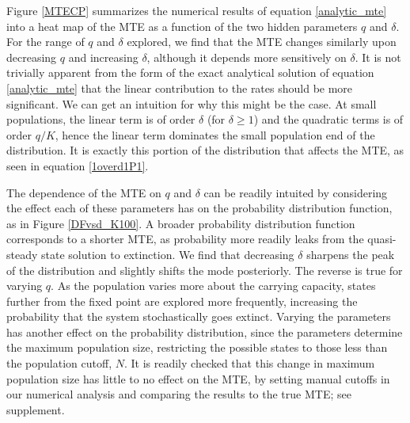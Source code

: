 Figure \ref{MTECP} summarizes the numerical results of equation \ref{analytic_mte} into a heat map of the MTE as a function of the two hidden parameters $q$ and $\delta$.
For the range of $q$ and $\delta$ explored, we find that the MTE changes similarly upon decreasing $q$ and increasing $\delta$, although it depends more sensitively on $\delta$.
It is not trivially apparent from the form of the exact analytical solution of equation \ref{analytic_mte} that the linear contribution to the rates should be more significant.
We can get an intuition for why this might be the case.
At small populations, the linear term is of order $\delta$ (for $\delta \geq 1$) and the quadratic terms is of order $q/K$, hence the linear term dominates the small population end of the distribution.
It is exactly this portion of the distribution that affects the MTE, as seen in equation \ref{1overd1P1}.

The dependence of the MTE on $q$ and $\delta$ can be readily intuited by considering the effect each of these parameters has on the probability distribution function, as in Figure \ref{DFvsd_K100}.
A broader probability distribution function corresponds to a shorter MTE, as probability more readily leaks from the quasi-steady state solution to extinction.
We find that decreasing $\delta$ sharpens the peak of the distribution and slightly shifts the mode posteriorly. 
The reverse is true for varying $q$. 
As the population varies more about the carrying capacity, states further from the fixed point are explored more frequently, increasing the probability that the system stochastically goes extinct. 
Varying the parameters has another effect on the probability distribution, since the parameters determine the maximum population size, restricting the possible states to those less than the population cutoff, $N$.
It is readily checked that this change in maximum population size has little to no effect on the MTE, by setting manual cutoffs in our numerical analysis and comparing the results to the true MTE; see supplement.


